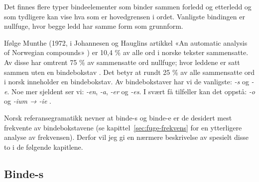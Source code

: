 Det finnes flere typer bindeelementer som binder sammen forledd og etterledd og som tydligere kan vise hva som er hovedgrensen i ordet. Vanligste bindingen er nullfuge, hvor begge ledd har samme form som grunnform.


Ifølge Munthe (1972, i Johannesen og Hauglins artikkel «An automatic analysis of Norwegian compounds» \cite{johannessen1996automatic}) er 10,4 \% av alle ord i norske tekster sammensatte. Av disse har omtrent 75 \% av sammensatte ord nullfuge; hvor leddene er satt sammen uten en bindebokstav \cite{johannessen1996automatic}. Det betyr at rundt 25 \% av alle sammensatte ord i norsk inneholder en bindebokstav. Av bindebokstaver har vi de vanligste: \textit{-s} og \textit{-e}. Noe mer sjeldent ser vi: \textit{-en}, \textit{-a}, \textit{-er} og \textit{-es}. I svært få tilfeller kan det oppstå: \textit{-o} og \textit{-ium → -ie} \cite{faarlund1997norsk,bindebokstaver}.

\newline
{}\newline
{}\newline
{}\newline
{}\newline
{}\newline
{}\newline
{}\newline

\begin{center}
{\huge\color{gray!50}{\decofourleft}}
\end{center}

Norsk referansegramatikk nevner at binde-s og binde-e er de desidert mest frekvente av bindebokstavene (se kapittel~\ref{sec:fuge-frekvens} for en ytterligere analyse av frekvensen). Derfor vil jeg gi en nærmere beskrivelse av spesielt disse to i de følgende kapitlene. 

\subsection{Binde-s}
\label{sec:ord-bind1}

